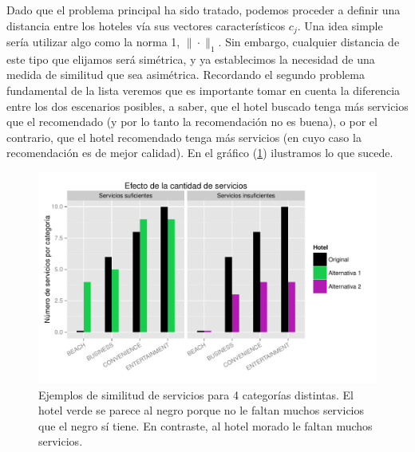 \documentclass[12pt]{report}
\begin{document}
Dado que el problema principal ha sido tratado, podemos proceder a definir una distancia entre los hoteles vía sus vectores característicos $c_j$. Una idea simple sería utilizar algo como la norma 1, $\| \cdot \|_1$. Sin embargo, cualquier distancia de este tipo que elijamos será simétrica, y ya establecimos la necesidad de una medida de similitud que sea asimétrica. Recordando el segundo problema fundamental de la lista veremos que es importante tomar en cuenta la diferencia entre los dos escenarios posibles, a saber, que el hotel buscado tenga más servicios que el recomendado (y por lo tanto la recomendación no es buena), o por el contrario, que el hotel recomendado tenga más servicios (en cuyo caso la recomendación es de mejor calidad). En el gráfico (\ref{simserv}) ilustramos lo que sucede.
\begin{figure}[ht]
	\centering
	\includegraphics[width=\textwidth]{imagenes/simserv.pdf}
	\caption{\label{simserv} Ejemplos de similitud de servicios para 4 categorías distintas. El hotel verde se parece al negro porque no le faltan muchos servicios que el negro sí tiene. En contraste, al hotel morado le faltan muchos servicios.}
\end{figure}
\end{document}
